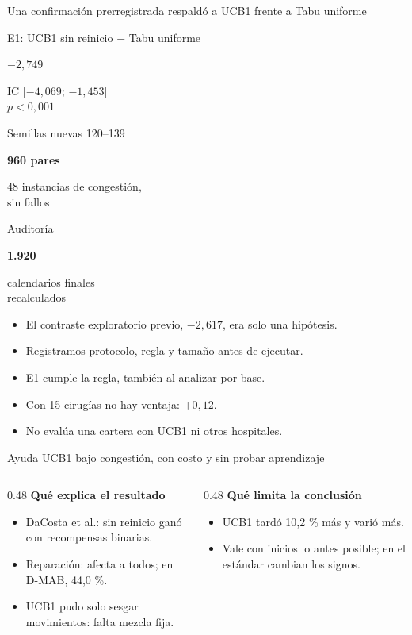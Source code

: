 \documentclass[aspectratio=169,11pt]{beamer}
\newcommand{\cifra}[3]{%
  \begin{minipage}[t]{0.31\textwidth}\centering
    {\scriptsize\color{gris}#1\par}\vspace{0.1cm}
    {\LARGE\bfseries\boldmath\color{azul}#2\par}\vspace{0.1cm}
    {\scriptsize #3\par}
  \end{minipage}}
\begin{document}
\begin{frame}{Una confirmación prerregistrada respaldó a UCB1 frente a Tabu uniforme}
  \centering
  \cifra{E1: UCB1 sin reinicio $-$ Tabu uniforme}{$-2{,}749$}{IC [$-4{,}069$; $-1{,}453$]\\$p<0{,}001$}\hfill
  \cifra{Semillas nuevas 120--139}{960 pares}{48 instancias de congestión,\\sin fallos}\hfill
  \cifra{Auditoría}{1.920}{calendarios finales\\recalculados}

  \vspace{0.4cm}
  \raggedright
  \begin{itemize}
    \item El contraste exploratorio previo, $-2{,}617$, era solo una hipótesis.
    \item Registramos protocolo, regla y tamaño antes de ejecutar.
    \item E1 cumple la regla, también al analizar por base.
    \item Con 15 cirugías no hay ventaja: $+0{,}12$.
    \item No evalúa una cartera con UCB1 ni otros hospitales.
  \end{itemize}
\end{frame}


\begin{frame}{Ayuda UCB1 bajo congestión, con costo y sin probar aprendizaje}
  \begin{columns}[t,onlytextwidth]
    \begin{column}{0.48\textwidth}
      {\bfseries\color{azul} Qué explica el resultado}
      \begin{itemize}
        \item DaCosta et al.: sin reinicio ganó con recompensas binarias.
        \item Reparación: afecta a todos; en D-MAB, 44,0 \%.
        \item UCB1 pudo solo sesgar movimientos: falta mezcla fija.
      \end{itemize}
    \end{column}
    \begin{column}{0.48\textwidth}
      {\bfseries\color{azul} Qué limita la conclusión}
      \begin{itemize}
        \item UCB1 tardó 10,2 \% más y varió más.
        \item Vale con inicios lo antes posible; en el estándar cambian los signos.
      \end{itemize}
    \end{column}
  \end{columns}
\end{frame}
\end{document}
